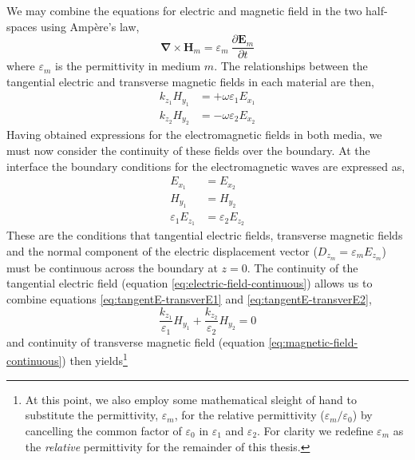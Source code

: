 We may combine the equations for electric and magnetic field in the two half-spaces using Amp\`ere's law,
\begin{equation*}
\mathbf{\nabla}\times\mathbf{H}_m=\varepsilon_m\:\frac{\partial\mathbf{E}_m}{\partial t}
\end{equation*}
where $\varepsilon_m$ is the permittivity in medium $m$. The relationships between the tangential electric and transverse magnetic fields in each material are then,
\begin{align}
k_{z_1}H_{y_1}&=+\omega\varepsilon_1E_{x_1}\label{eq:tangentE-transverE1}\\
k_{z_2}H_{y_2}&=-\omega\varepsilon_2E_{x_2}\label{eq:tangentE-transverE2}
\end{align}
Having obtained expressions for the electromagnetic fields in both media, we must now consider the continuity of these fields over the boundary. At the interface the boundary conditions for the electromagnetic waves are expressed as,
\begin{align}
E_{x_1}&=E_{x_2}\label{eq:electric-field-continuous}\\
H_{y_1}&=H_{y_2}\label{eq:magnetic-field-continuous}\\
\varepsilon_1E_{z_1}&=\varepsilon_2E_{z_2}\label{eq:d-continuous}
\end{align}
These are the conditions that tangential electric fields, transverse magnetic fields and the normal component of the electric displacement vector ($D_{z_m}=\varepsilon_m E_{z_m}$) must be continuous across the boundary at $z=0$. The continuity of the tangential electric field (equation \ref{eq:electric-field-continuous}) allows us to combine equations \ref{eq:tangentE-transverE1} and \ref{eq:tangentE-transverE2},
\begin{equation*}
\frac{k_{z_1}}{\varepsilon_1}H_{y_1}+\frac{k_{z_2}}{\varepsilon_2}H_{y_2}=0
\end{equation*}
and continuity of transverse magnetic field (equation \ref{eq:magnetic-field-continuous}) then yields\footnote{At this point, we also employ some mathematical sleight of hand to substitute the permittivity, $\varepsilon_m$, for the relative permittivity ($\varepsilon_m/\varepsilon_0$) by cancelling the common factor of $\varepsilon_0$ in $\varepsilon_1$ and $\varepsilon_2$. For clarity we redefine $\varepsilon_m$ as the \textit{relative} permittivity for the remainder of this thesis.}
